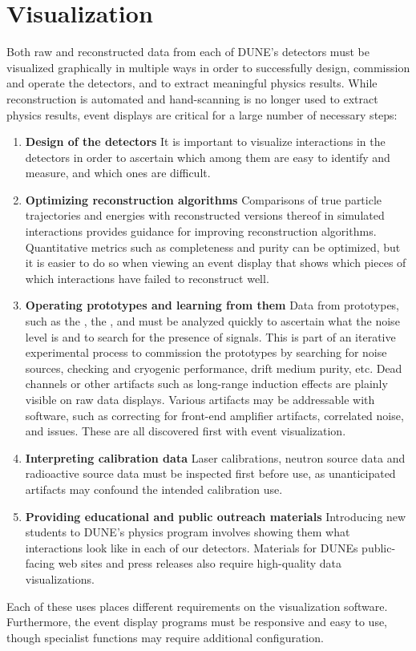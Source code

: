 \documentclass[../main-v1.tex]{subfiles}
\begin{document}
\section{Visualization}
\label{sec:visualization}
Both raw and reconstructed data from each of DUNE's detectors must be visualized graphically in multiple ways in order to successfully design, commission and operate the detectors, and to extract meaningful physics results.  While reconstruction is automated and hand-scanning is no longer used to extract physics results, event displays are critical for a large number of necessary steps:
\begin{enumerate}
    \item {\bf Design of the detectors}   It is important to visualize interactions in the detectors in order to ascertain which among them are easy to identify and measure, and which ones are difficult.
    \item{\bf Optimizing reconstruction algorithms}  Comparisons of true particle trajectories and energies with reconstructed versions thereof in simulated interactions provides guidance for improving reconstruction algorithms.  Quantitative metrics such as completeness and purity can be optimized, but it is easier to do so when viewing an event display that shows which pieces of which interactions have failed to reconstruct well.
    \item{\bf Operating prototypes and learning from them}  Data from prototypes, such as the , the , and  must be analyzed quickly to ascertain what the noise level is and to search for the presence of signals.  This is part of an iterative experimental process to commission the prototypes by searching for noise sources, checking  and cryogenic performance, drift medium purity, etc.  Dead channels or other artifacts such as long-range induction effects are plainly visible on raw data displays.  Various artifacts may be addressable with software, such as correcting for front-end amplifier artifacts, correlated noise, and  issues.  These are all discovered first with event visualization.
    \item{\bf Interpreting calibration data}  Laser calibrations, neutron source data and radioactive source data must be inspected first before use, as unanticipated artifacts may confound the intended calibration use.
    \item{\bf Providing educational and public outreach materials}  Introducing new students to DUNE's physics program involves showing them what interactions look like in each of our detectors.  Materials for DUNEs public-facing web sites and press releases also require high-quality data visualizations.
\end{enumerate}
Each of these uses places different requirements on the visualization software.  Furthermore, the event display programs must be responsive and easy to use, though specialist functions may require additional configuration.
\end{document}
